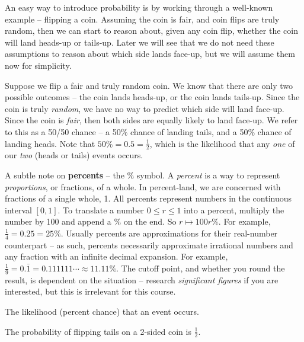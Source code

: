 \documentclass[main.tex]{subfiles}
\begin{document}
An easy way to introduce probability is by working through a well-known example -- flipping a coin. Assuming the coin is fair, and coin flips are truly random, then we can start to reason about, given any coin flip, whether the coin will land heads-up or tails-up. Later we will see that we do not need these assumptions to reason about which side lands face-up, but we will assume them now for simplicity.

Suppose we flip a fair and truly random coin. We know that there are only two possible outcomes -- the coin lands heads-up, or the coin lands tails-up. Since the coin is truly \textit{random}, we have no way to predict which side will land face-up. Since the coin is \textit{fair}, then both sides are equally likely to land face-up. We refer to this as a 50/50 chance -- a 50\% chance of landing tails, and a 50\% chance of landing heads. Note that \(50\% = 0.5 = \frac{1}{2}\), which is the likelihood that any \textit{one} of our \textit{two} (heads or tails) events occurs.
\begin{center}
\end{center}

A subtle note on \textbf{percents} -- the \(\%\) symbol. A \textit{percent} is a way to represent \textit{proportions}, or fractions, of a whole. In percent-land, we are concerned with fractions of a single whole, 1. All percents represent numbers in the continuous interval \([0,1]\). To translate a number \(0 \leq r \leq 1\) into a percent, multiply the number by 100 and append a \(\%\) on the end. So \(r \mapsto 100r\%\). For example, \(\frac{1}{4} = 0.25 = 25\%\). Usually percents are approximations for their real-number counterpart -- as such, percents necessarily approximate irrational numbers and any fraction with an infinite decimal expansion. For example, \(\frac{1}{9} = 0.\bar{1} = 0.111111\cdots \approx 11.11\%\). The cutoff point, and whether you round the result, is dependent on the situation -- research \textit{significant figures} if you are interested, but this is irrelevant for this course.

\begin{defn}
	The likelihood (percent chance) that an event occurs.
\end{defn}

\begin{example}
	The probability of flipping tails on a 2-sided coin is \(\frac{1}{2}\).
\end{example}
\end{document}

